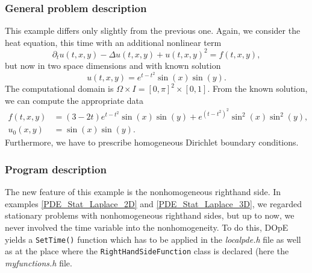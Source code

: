 \subsubsection{General problem description}

This example differs only slightly from the previous one. Again, we consider the heat equation, this time with an additional nonlinear term
\begin{equation*}
\partial_t u(t,x,y) - \Delta u(t,x,y) + u(t,x,y)^2 = f(t,x,y),
\end{equation*}
but now in two space dimensions and with known solution 
\begin{equation*}
u(t,x,y) = e^{t-t^2} \sin(x) \sin(y).
\end{equation*}
The computational domain is $\Omega \times I = [0,\pi]^2 \times [0,1]$. From the known solution, we can compute the appropriate data 
\begin{align*}
f(t,x,y) &= (3-2t)e^{t-t^2} \sin(x) \sin(y) + e^{(t-t^2)^2} \sin^2(x) \sin^2(y),\\
u_0(x,y) &= \sin(x) \sin(y).
\end{align*}
Furthermore, we have to prescribe homogeneous Dirichlet boundary conditions.

\subsubsection{Program description}

The new feature of this example is the nonhomogeneous righthand side. In examples \ref{PDE_Stat_Laplace_2D} and \ref{PDE_Stat_Laplace_3D}, we regarded stationary problems with nonhomogeneous righthand sides, but up to now, we never involved the time variable into the nonhomogeneity. To do this, DOpE yields a \texttt{SetTime()} function which has to be applied in the \textit{localpde.h} file as well as at the place where the \texttt{RightHandSideFunction} class is declared (here the \textit{myfunctions.h} file.
